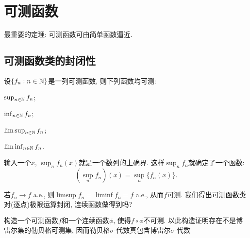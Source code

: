 \section{可测函数}
最重要的定理: 可测函数可由简单函数逼近.
\subsection{可测函数类的封闭性}
设$\{f_n: n \in \mathbb{N}\}$是一列可测函数, 则下列函数均可测:
\begin{enumerate}
{\everymath{\displaystyle}
    \item $\sup_{n \in \mathbb{N}}f_n$;
    \item $\inf_{n \in \mathbb{N}} f_n$;
    \item $\limsup_{n \in \mathbb{N}} f_n$;
    \item $\liminf_{n \in \mathbb{N}} f_n$.}
\end{enumerate}
\begin{remark}
    输入一个$x$, $\sup_n f_n(x)$就是一个数列的上确界. 
    这样$\sup_n f_n$就确定了一个函数: 
    $$\left(\sup_n f_n\right)(x) = \sup_n \{f_n(x)\}.$$
\end{remark}
若$f_n \to f$ a.e., 则$\limsup f_n = \liminf f_n = f$ a.e., 从而$f$可测. 我们得出可测函数类对(逐点)极限运算封闭, 连续函数做得到吗? 

\begin{exercise}
    构造一个可测函数$f$和一个连续函数$\phi$, 使得$f \circ \phi$不可测.
    以此构造证明存在不是博雷尔集的勒贝格可测集, 因而勒贝格$\sigma$-代数真包含博雷尔$\sigma$-代数
\end{exercise}




